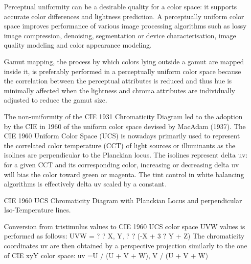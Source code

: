 
Perceptual uniformity can be a desirable quality for a color space: it supports accurate color differences and lightness prediction. A perceptually uniform color space improves performance of various image processing algorithms such as lossy image compression, denoising, segmentation or device characterisation, image quality modeling and color appearance modeling.

Gamut mapping, the process by which colors lying outside a gamut are mapped inside it, is preferably performed in a perceptually uniform color space because the correlation between the perceptual attributes is reduced and thus hue is minimally affected when the lightness and chroma attributes are individually adjusted to reduce the gamut size.

The non-uniformity of the CIE 1931 Chromaticity Diagram led to the adoption by the CIE in 1960 of the uniform color space devised by MacAdam (1937). The CIE 1960 Uniform Color Space (UCS) is nowadays primarily used to represent the correlated color temperature (CCT) of light sources or illuminants as the isolines are perpendicular to the Planckian locus. The isolines represent delta uv: for a given CCT and its corresponding color, increasing or decreasing delta uv will bias the color toward green or magenta. The tint control in white balancing algorithms is effectively delta uv scaled by a constant.

CIE 1960 UCS Chromaticity Diagram with Planckian Locus and perpendicular Iso-Temperature lines.

Conversion from tristimulus values to CIE 1960 UCS color space UVW values is performed as follows:
UVW = ? ? X, Y, ? ? (-X + 3 ? Y + Z)
The chromaticity coordinates uv are then obtained by a perspective projection similarly to the one of CIE xyY color space:
uv =U / (U + V + W), V / (U + V + W)


